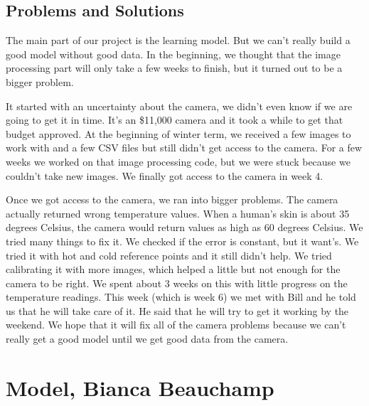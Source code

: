 \documentclass[onecolumn, draftclsnofoot,10pt, compsoc]{IEEEtran}
\begin{document}
\subsection{Problems and Solutions}
The main part of our project is the learning model. But we can’t really build a good model without good data. In the beginning, we thought that the image processing part will only take a few weeks to finish, but it turned out to be a bigger problem. 


It started with an uncertainty about the camera, we didn’t even know if we are going to get it in time. It’s an \$11,000 camera and it took a while to get that budget approved. At the beginning of winter term, we received a few images to work with and a few CSV files but still didn’t get access to the camera. For a few weeks we worked on that image processing code, but we were stuck because we couldn’t take new images. We finally got access to the camera in week 4. 

Once we got access to the camera, we ran into bigger problems. The camera actually returned wrong temperature values. When a human’s skin is about 35 degrees Celsius, the camera would return values as high as 60 degrees Celsius.  We tried many things to fix it. We checked if the error is constant, but it want’s.  We tried it with hot and cold reference points and it still didn’t help. We tried calibrating it with more images, which helped a little but not enough for the camera to be right. We spent about 3 weeks on this with little progress on the temperature readings. This week (which is week 6) we met with Bill and he told us that he will take care of it. He said that he will try to get it working by the weekend. We hope that it will fix all of the camera problems because we can’t really get a good model until we get good data from the camera.\cite{ClaudeTech}


\section{Model, Bianca Beauchamp}
\end{document}

